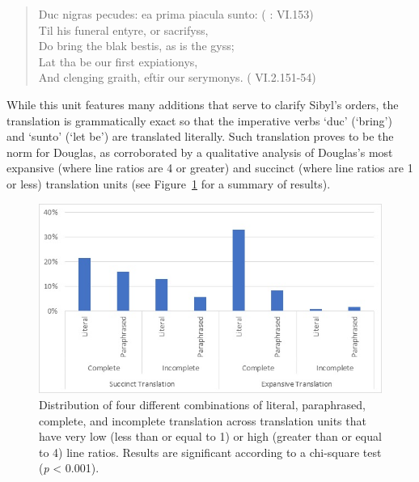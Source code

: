 \documentclass{dhbenelux}
\begin{document}
\begin{quote}
Duc nigras pecudes: ea prima piacula sunto: (\citeauthor{virgil1501} \citeyear{virgil1501}: VI.153)\\

Til his funeral entyre, or sacrifyss,\\
Do bring the blak bestis, as is the gyss;\\
Lat tha be {\textyogh}our first expiationys,\\
And clenging graith, eftir {\textyogh}our serymonys. (\citeauthor{douglas1957} 
VI.2.151-54)
\end{quote}

While this unit features many additions that serve to clarify Sibyl's
orders, the translation is grammatically exact so that the imperative
verbs `duc' (`bring') and `sunto' (`let be') are translated literally.
Such translation proves to be the norm for Douglas, as corroborated by a
qualitative analysis of Douglas's most expansive (where line ratios are
4 or greater) and succinct (where line ratios are 1 or less) translation
units (see Figure~\ref{fig:figure1} for a summary of results).

\begin{figure}[H]
\begin{center}
\includegraphics[width=1\linewidth]{Images/Figure1.jpg}
\end{center}
\caption{Distribution of four different combinations of literal, paraphrased, complete, and incomplete translation across translation units that have very low (less than or equal to 1) or high (greater than or equal to 4) line ratios.  Results are significant according to a chi-square test (\emph{p} < 0.001).}
\label{fig:figure1}
\end{figure}
\end{document}
